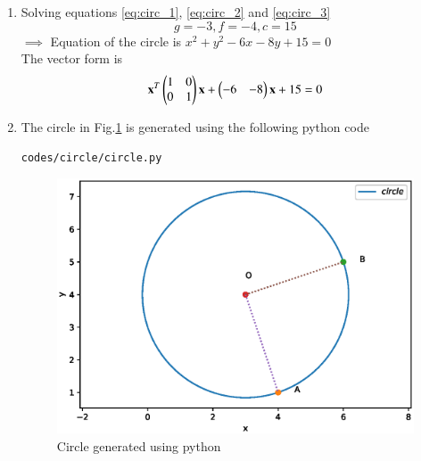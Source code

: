\begin{enumerate}[label=\arabic*.,ref=\thesubsection.\theenumi]
\item Solving equations \ref{eq:circ_1}, \ref{eq:circ_2} and \ref{eq:circ_3} \\
$$ g = -3, f = -4, c = 15$$
$\implies$ Equation of the circle is $x^2+y^2-6x-8y+15=0$ \\ 
The vector form is 
$$\mathbf{x}^T\begin{pmatrix}1&0\\0&1\end{pmatrix}\mathbf{x}+\begin{pmatrix}-6&-8\end{pmatrix}\mathbf{x}+15=0$$

\item The circle in Fig.\ref{fig:circ_1} is generated using the following python code 
\begin{lstlisting}
codes/circle/circle.py
\end{lstlisting}

\begin{figure}[!ht]
\centering
\includegraphics[width=\columnwidth]{./codes/circle/circle.eps}
\caption{Circle generated using python}
\label{fig:circ_1}
\end{figure}

\end{enumerate}